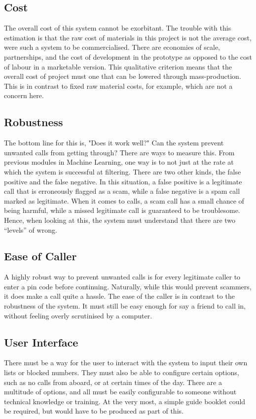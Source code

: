 \documentclass[12pt,a4paper]{report}
\begin{document}
\subsection{Cost}
The overall cost of this system cannot be exorbitant. The trouble with this estimation is that the raw cost of materials in this project is not the average cost, were such a system to be commercialised. There are economies of scale, partnerships, and the cost of development in the prototype as opposed to the cost of labour in a marketable version. This qualitative criterion means that the overall cost of project must one that can be lowered through mass-production. This is in contrast to fixed raw material costs, for example, which are not a concern here.
\subsection{Robustness}
The bottom line for this is, "Does it work well?" Can the system prevent unwanted calls from getting through? There are ways to measure this. From previous modules in Machine Learning, one way is to not just at the rate at which the system is successful at filtering. There are two other kinds, the false positive and the false negative. In this situation, a false positive is a legitimate call that is erroneously flagged as a scam, while a false negative is a spam call marked as legitimate. When it comes to calls, a scam call has a small chance of being harmful, while a missed legitimate call is guaranteed to be troublesome. Hence, when looking at this, the system must understand that there are two ``levels'' of wrong.
\subsection{Ease of Caller}
A highly robust way to prevent unwanted calls is for every legitimate caller to enter a pin code before continuing. Naturally, while this would prevent scammers, it does make a call quite a hassle. The ease of the caller is in contrast to the robustness of the system. It must still be easy enough for say a friend to call in, without feeling overly scrutinised by a computer.
\subsection{User Interface}
There must be a way for the user to interact with the system to input their own lists or blocked numbers. They must also be able to configure certain options, such as no calls from aboard, or at certain times of the day. There are a multitude of options, and all must be easily configurable to someone without technical knowledge or training. At the very most, a simple guide booklet could be required, but would have to be produced as part of this.
\end{document}

